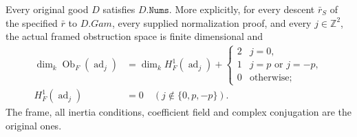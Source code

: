 \begin{proposition}
\label{claim:DX4}
Every original good $D$ satisfies $D.\texttt{Nums}$.
More explicitly, for every descent $\bar r_S$ of the specified
$\bar r$ to $D.Gam$, every supplied normalization proof, and
every $j\in\mathbb Z^2$, the actual framed obstruction space
is finite dimensional and
\[
 \begin{aligned}
 \dim_k\operatorname{Ob}_F(\operatorname{ad}_j)
   &=\dim_kH^1_F(\operatorname{ad}_j)+
      \begin{cases}2&j=0,\\1&j=p\text{ or }j=-p,\\0&\text{otherwise};
      \end{cases}\\
 H^1_F(\operatorname{ad}_j)&=0
                         \quad(j\notin\{0,p,-p\}).
 \end{aligned}
 \tag{DX.20}
\]
The frame, all inertia conditions, coefficient field and complex
conjugation are the original ones.
\end{proposition}


